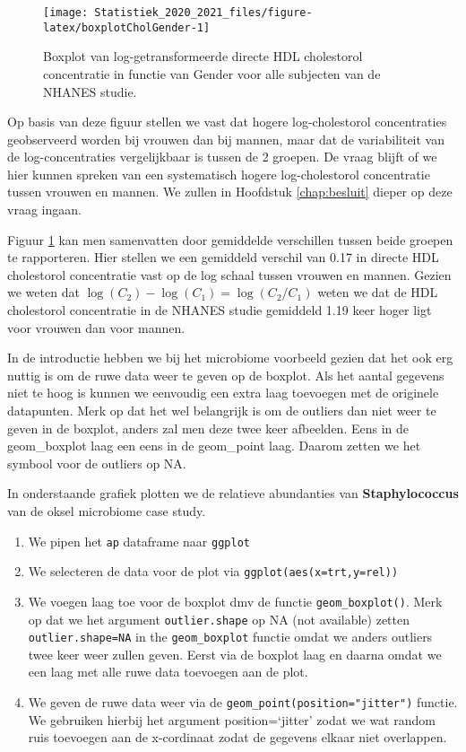 \documentclass[
  12pt,dutch,coursenotes]{book}
\providecommand{\tightlist}{%
  \setlength{\itemsep}{0pt}\setlength{\parskip}{0pt}}
\theoremstyle{definition}
\theoremstyle{definition}
\theoremstyle{definition}
\theoremstyle{remark}
\begin{document}
\begin{figure}

{\centering \texttt{[image: Statistiek\_2020\_2021\_files/figure-latex/boxplotCholGender-1]} 

}

\caption{Boxplot van log-getransformeerde directe HDL cholestorol concentratie in functie van Gender voor alle subjecten van de NHANES studie.}\label{fig:boxplotCholGender}
\end{figure}

Op basis van deze figuur
stellen we vast dat hogere log-cholestorol concentraties
geobserveerd worden bij vrouwen dan bij mannen, maar dat de variabiliteit
van de log-concentraties vergelijkbaar is tussen de 2 groepen. De vraag blijft of we hier kunnen spreken van een systematisch hogere
log-cholestorol concentratie tussen vrouwen en mannen. We zullen in Hoofdstuk \ref{chap:besluit} dieper op deze vraag ingaan.

Figuur \ref{fig:boxplotCholGender} kan men samenvatten door gemiddelde verschillen tussen beide groepen te rapporteren. Hier stellen we een gemiddeld verschil van 0.17 in directe HDL cholestorol concentratie vast op de log schaal tussen vrouwen en mannen.
Gezien we weten dat \(\log(C_2)-\log(C_1)=\log(C_2/C_1)\) weten we dat de HDL cholestorol concentratie in de NHANES studie gemiddeld 1.19 keer hoger ligt voor vrouwen dan voor mannen.

In de introductie hebben we bij het microbiome voorbeeld gezien dat het ook erg nuttig is om de ruwe data weer te geven op de boxplot. Als het aantal gegevens niet te hoog is kunnen we eenvoudig een extra laag toevoegen met de originele datapunten. Merk op dat het wel belangrijk is om de outliers dan niet weer te geven in de boxplot, anders zal men deze twee keer afbeelden. Eens in de geom\_boxplot laag een eens in de geom\_point laag. Daarom zetten we het symbool voor de outliers op NA.

In onderstaande grafiek plotten we de relatieve abundanties van \textbf{Staphylococcus} van de oksel microbiome case study.

\begin{enumerate}
\def\labelenumi{\arabic{enumi}.}
\tightlist
\item
  We pipen het \texttt{ap} dataframe naar \texttt{ggplot}
\item
  We selecteren de data voor de plot via \texttt{ggplot(aes(x=trt,y=rel))}
\item
  We voegen laag toe voor de boxplot dmv de functie \texttt{geom\_boxplot()}. Merk op dat we het argument \texttt{outlier.shape} op NA (not available) zetten \texttt{outlier.shape=NA} in the \texttt{geom\_boxplot} functie omdat we anders outliers twee keer weer zullen geven. Eerst via de boxplot laag en daarna omdat we een laag met alle ruwe data toevoegen aan de plot.
\item
  We geven de ruwe data weer via de \texttt{geom\_point(position="jitter")} functie. We gebruiken hierbij het argument position=`jitter' zodat we wat random ruis toevoegen aan de x-cordinaat zodat de gegevens elkaar niet overlappen.
\end{enumerate}
\end{document}
